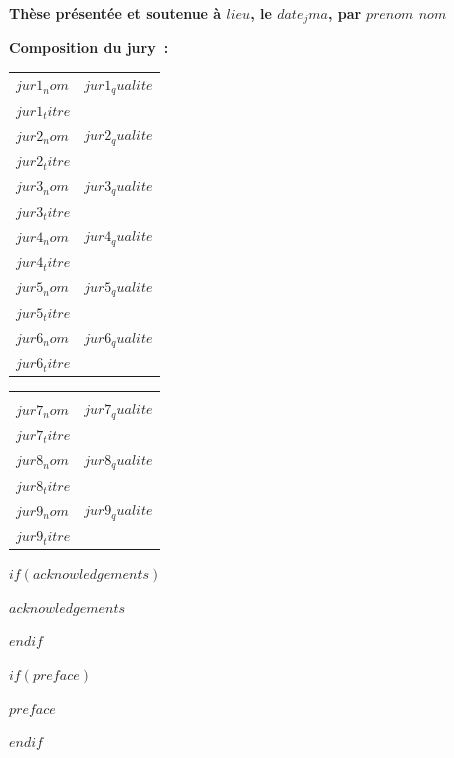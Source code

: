 \documentclass[12pt,a4paper]{reedthesis}
\begin{document}
\begin{titlepage}
\vspace{10mm}

\textbf{Thèse présentée et soutenue à $lieu$, le $date_jma$, par}
\bigskip
\Large {\color{Prune} \textbf{$prenom$ $nom$}}

\vspace{15mm}

\flushleft \normalsize \textbf{Composition du jury~:}
\bigskip

\scriptsize
{}
\begin{tabular}{|p{8cm}l}
\textbf{$jur1_nom$} &  $jur1_qualite$\\
$jur1_titre$ & \\
\textbf{$jur2_nom$} &  $jur2_qualite$\\
$jur2_titre$ & \\
\textbf{$jur3_nom$} &  $jur3_qualite$\\
$jur3_titre$ & \\
\textbf{$jur4_nom$} &  $jur4_qualite$\\
$jur4_titre$ & \\
\textbf{$jur5_nom$} &  $jur5_qualite$\\
$jur5_titre$ & \\
\textbf{$jur6_nom$} &  $jur6_qualite$\\
$jur6_titre$ & \\
\end{tabular}

\begin{tabular}{p{8cm}l}
& \\
\textbf{$jur7_nom$} &  $jur7_qualite$\\
$jur7_titre$ & \\
\textbf{$jur8_nom$} &  $jur8_qualite$\\
$jur8_titre$ & \\
\textbf{$jur9_nom$} &  $jur9_qualite$\\
$jur9_titre$ & \\
\end{tabular}

\end{titlepage}

\frontmatter %
\pagestyle{empty} %

$if(acknowledgements)$
  \begin{acknowledgements}
    $acknowledgements$
  \end{acknowledgements}
$endif$

$if(preface)$
  \begin{preface}
    $preface$
  \end{preface}
$endif$
\end{document}
